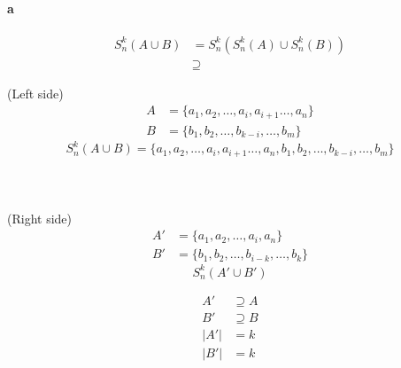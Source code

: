 \paragraph{a}
\begin{align*}
    S^{k}_{n}(A \cup B) &= S^{k}_{n}(S^{k}_{n}(A) \cup S^{k}_{n}(B))\\
    &\supseteq
\end{align*}

(Left side)
\begin{align*}
    A &=\{a_1, a_2, \dots , a_{i}, a_{i+1} \dots  , a_n\}\\
    B &=\{b_1, b_2, \dots , b_{k-i}, \dots , b_m\}
\end{align*}
\begin{equation*}
    S^{k}_{n}(A\cup B) =\{a_1, a_2, \dots , a_{i}, a_{i+1} \dots  , a_n, b_1, b_2, \dots , b_{k-i}, \dots , b_m\}
\end{equation*}
\\ \\ \\
(Right side)
\begin{align*}
    A' &=\{a_1, a_2, \dots , a_{i}, a_{n}\}\\
    B' &=\{b_1, b_2, \dots , b_{i-k}, \dots , b_k\}
\end{align*}
\begin{equation*}
    S^{k}_{n}(A' \cup B')
\end{equation*}

\begin{align*}
    A' &\supseteq A\\
    B' &\supseteq B\\
    |A'| &= k\\
    |B'| &= k
\end{align*}
